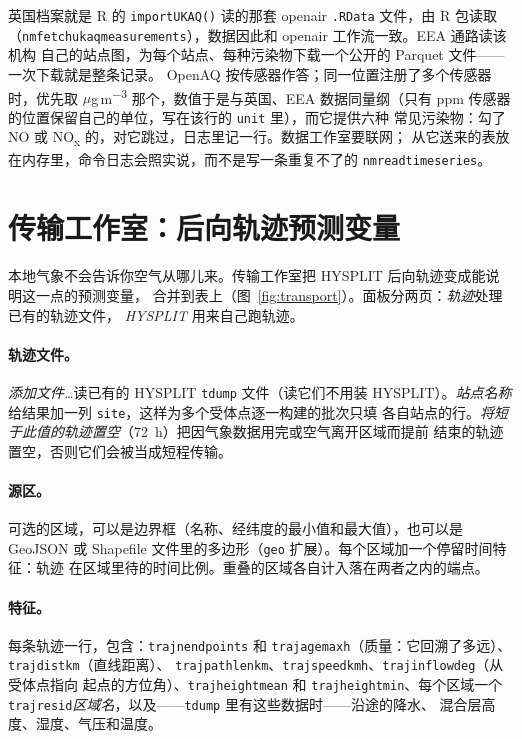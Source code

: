 \documentclass[11pt]{ctexrep}
\newcommand{\codeunderscore}{\textunderscore\allowbreak}
\newcommand{\code}[1]{\texttt{\let\_\codeunderscore #1}}
\newcommand{\ugm}{\ensuremath{\mu}g\,m\textsuperscript{$-3$}}
\begin{document}
英国档案就是 R 的 \code{importUKAQ()} 读的那套 openair \code{.RData} 文件，由 R 包读取
（\code{nm\_fetch\_ukaq\_measurements}），数据因此和 openair 工作流一致。EEA 通路读该机构
自己的站点图，为每个站点、每种污染物下载一个公开的 Parquet 文件——一次下载就是整条记录。
OpenAQ 按传感器作答；同一位置注册了多个传感器时，优先取 \ugm{} 那个，数值于是与英国、EEA
数据同量纲（只有 ppm 传感器的位置保留自己的单位，写在该行的 \code{unit} 里），而它提供六种
常见污染物：勾了 NO 或 NO\textsubscript{x} 的，对它跳过，日志里记一行。数据工作室要联网；
从它送来的表放在内存里，命令日志会照实说，而不是写一条重复不了的
\code{nm\_read\_time\_series}。


\section{传输工作室：后向轨迹预测变量}\label{sec:transport}
本地气象不会告诉你空气从哪儿来。传输工作室把 HYSPLIT 后向轨迹变成能说明这一点的预测变量，
合并到表上（图~\ref{fig:transport}）。面板分两页：\emph{轨迹}处理已有的轨迹文件，
\emph{HYSPLIT} 用来自己跑轨迹。

\paragraph{轨迹文件。}\emph{添加文件…}读已有的 HYSPLIT \code{tdump} 文件（读它们不用装
HYSPLIT）。\emph{站点名称}给结果加一列 \code{site}，这样为多个受体点逐一构建的批次只填
各自站点的行。\emph{将短于此值的轨迹置空}（72~h）把因气象数据用完或空气离开区域而提前
结束的轨迹置空，否则它们会被当成短程传输。

\paragraph{源区。}可选的区域，可以是边界框（名称、经纬度的最小值和最大值），也可以是
GeoJSON 或 Shapefile 文件里的多边形（\code{geo} 扩展）。每个区域加一个停留时间特征：轨迹
在区域里待的时间比例。重叠的区域各自计入落在两者之内的端点。

\paragraph{特征。}每条轨迹一行，包含：\code{traj\_n\_endpoints} 和
\code{traj\_age\_max\_h}（质量：它回溯了多远）、\code{traj\_dist\_km}（直线距离）、
\code{traj\_pathlen\_km}、\code{traj\_speed\_kmh}、\code{traj\_inflow\_deg}（从受体点指向
起点的方位角）、\code{traj\_height\_mean} 和 \code{traj\_height\_min}、每个区域一个
\code{traj\_resid\_}\emph{区域名}，以及——\code{tdump} 里有这些数据时——沿途的降水、
混合层高度、湿度、气压和温度。
\end{document}
